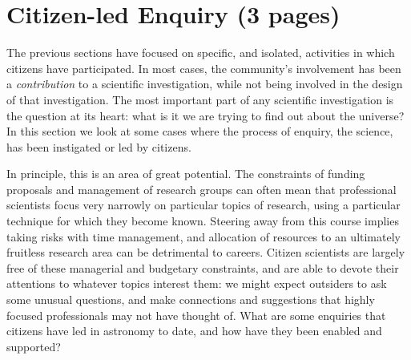 \documentclass{ar2e}
\begin{document}

% 
% 


 

\section{Citizen-led Enquiry (3 pages)}
\label{sec:explore}

The previous sections have focused on specific, and isolated, activities in
which citizens have participated. In most cases, the community's involvement has
been a {\it contribution} to a scientific investigation, while not being
involved in the design of that investigation. The most important part of any
scientific investigation is the question at its heart: what is it we are trying
to find out about the universe? In this section we look at some cases where the
process of enquiry, the science, has been instigated or led by citizens.  

In principle, this is an area of great potential. The constraints of funding
proposals and management of research groups can often mean that professional
scientists focus very narrowly on particular topics of research, using a
particular technique for which they become known.  Steering away from this
course implies taking risks with time management, and allocation of resources to
an ultimately fruitless research area can be detrimental to careers.  Citizen
scientists are largely free of these managerial and budgetary constraints, and
are able to devote their attentions to whatever topics interest them: we might
expect outsiders to ask some unusual questions, and make connections and
suggestions that highly focused professionals may not have thought of. What are
some enquiries that citizens have led in astronomy to date, and how have they
been enabled and supported?
\end{document}
